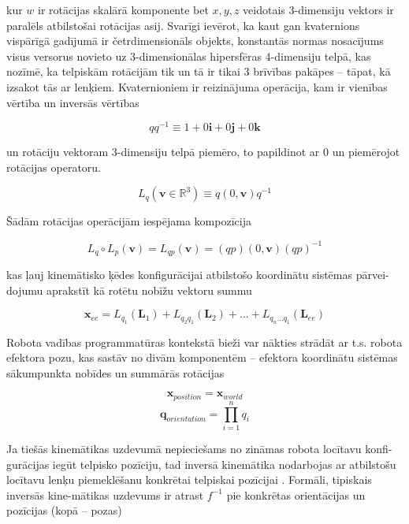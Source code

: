 \documentclass[12pt, a4paper]{article}
\numberwithin{equation}{section} %
\begin{document}
kur $w$ ir rotācijas skalārā komponente bet $x,y,z$ veidotais 3-dimensiju vektors ir paralēls atbilstošai rotācijas asij. Svarīgi ievērot, ka kaut gan kvaternions vispārīgā gadījumā ir četrdimensionāls objekts, konstantās normas nosacījums visus versorus novieto uz 3-dimensionālas hipersfēras 4-dimensiju telpā, kas nozīmē, ka telpiskām rotācijām tik un tā ir tikai 3 brīvības pakāpes -- tāpat, kā izsakot tās ar lenķiem. Kvaternioniem ir reizinājuma operācija, kam ir vienības vērtība un inversās vērtības

\begin{equation}
    qq^{-1} \equiv 1 +  0\boldsymbol{i} + 0\boldsymbol{j} + 0\boldsymbol{k}
\end{equation}

un rotāciju vektoram 3-dimensiju telpā piemēro, to papildinot ar 0 un piemērojot rotācijas operatoru.

\begin{equation}
    L_q(\boldsymbol{v} \in \mathbb{R}^3) \equiv q(0,\boldsymbol{v})q^{-1}
\end{equation}

Šādām rotācijas operācijām iespējama kompozīcija

\begin{equation}
    L_q \circ L_p (\boldsymbol{v}) = L_{qp}(\boldsymbol{v}) = (qp)(0,\boldsymbol{v})(qp)^{-1}
\end{equation}

kas ļauj kinemātisko ķēdes konfigurācijai atbilstošo koordinātu sistēmas pārvei-dojumu aprakstīt kā rotētu nobīžu vektoru summu

\begin{equation}
    \boldsymbol{x}_{ee} = L_{q_1}(\boldsymbol{L}_1) + L_{q_2q_1}(\boldsymbol{L}_2) + ... + L_{q_n...q_1}(\boldsymbol{L}_{ee})
\end{equation}

Robota vadības programmatūras kontekstā bieži var nākties strādāt ar t.s. robota efektora pozu, kas sastāv no divām komponentēm -- efektora koordinātu sistēmas sākumpunkta nobīdes un summārās rotācijas

\begin{equation}
    \boldsymbol{x}_{position} = \boldsymbol{x}_{world}
\end{equation}
\begin{equation}
    \boldsymbol{q}_{orientation} = \prod_{i=1}^n q_i
\end{equation}

Ja tiešās kinemātikas uzdevumā nepieciešams no zināmas robota locītavu konfi-gurācijas iegūt telpisko pozīciju, tad inversā kinemātika nodarbojas ar atbilstošu locītavu lenķu piemeklēšanu konkrētai telpiskai pozīcijai \cite{inverse_kinematics_illinois}. Formāli, tipiskais inversās kine-mātikas uzdevums ir atrast $f^{-1}$ pie konkrētas orientācijas un pozīcijas (kopā -- pozas)
\end{document}
